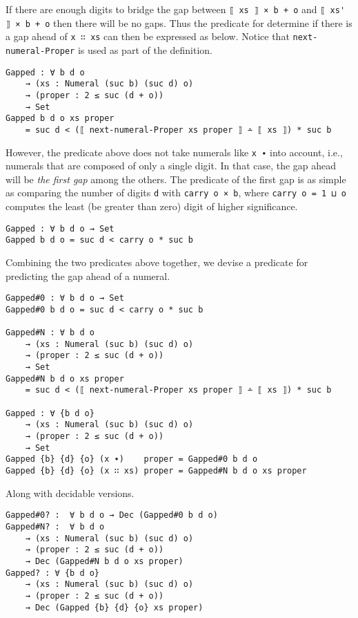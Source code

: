 \documentclass[\main/thesis.tex]{subfiles}
\begin{document}
If there are enough digits to bridge the gap between {\lstinline|⟦ xs ⟧ × b + o|}
and {\lstinline|⟦ xs' ⟧ × b + o|} then there will be no gaps.
Thus the predicate for determine if there is a gap ahead of {\lstinline|x ∷ xs|}
can then be expressed as below. Notice that {\lstinline|next-numeral-Proper|}
is used as part of the definition.

\begin{lstlisting}
Gapped : ∀ b d o
    → (xs : Numeral (suc b) (suc d) o)
    → (proper : 2 ≤ suc (d + o))
    → Set
Gapped b d o xs proper
    = suc d < (⟦ next-numeral-Proper xs proper ⟧ ∸ ⟦ xs ⟧) * suc b
\end{lstlisting}

However, the predicate above does not take numerals like {\lstinline|x ∙|} into
account, i.e., numerals that are composed of only a single digit.
In that case, the gap ahead will be \textit{the first gap} among the others.
The predicate of the first gap is as simple as comparing the number of digits
{\lstinline|d|} with {\lstinline|carry o × b|}, where {\lstinline|carry o = 1 ⊔ o|}
computes the least (be greater than zero) digit of higher significance.

\begin{lstlisting}
Gapped : ∀ b d o → Set
Gapped b d o = suc d < carry o * suc b
\end{lstlisting}

Combining the two predicates above together, we devise a predicate for
predicting the gap ahead of a numeral.

\begin{lstlisting}
Gapped#0 : ∀ b d o → Set
Gapped#0 b d o = suc d < carry o * suc b

Gapped#N : ∀ b d o
    → (xs : Numeral (suc b) (suc d) o)
    → (proper : 2 ≤ suc (d + o))
    → Set
Gapped#N b d o xs proper
    = suc d < (⟦ next-numeral-Proper xs proper ⟧ ∸ ⟦ xs ⟧) * suc b

Gapped : ∀ {b d o}
    → (xs : Numeral (suc b) (suc d) o)
    → (proper : 2 ≤ suc (d + o))
    → Set
Gapped {b} {d} {o} (x ∙)    proper = Gapped#0 b d o
Gapped {b} {d} {o} (x ∷ xs) proper = Gapped#N b d o xs proper
\end{lstlisting}

Along with decidable versions.

\begin{lstlisting}
Gapped#0? :  ∀ b d o → Dec (Gapped#0 b d o)
Gapped#N? :  ∀ b d o
    → (xs : Numeral (suc b) (suc d) o)
    → (proper : 2 ≤ suc (d + o))
    → Dec (Gapped#N b d o xs proper)
Gapped? : ∀ {b d o}
    → (xs : Numeral (suc b) (suc d) o)
    → (proper : 2 ≤ suc (d + o))
    → Dec (Gapped {b} {d} {o} xs proper)
\end{lstlisting}
\end{document}
